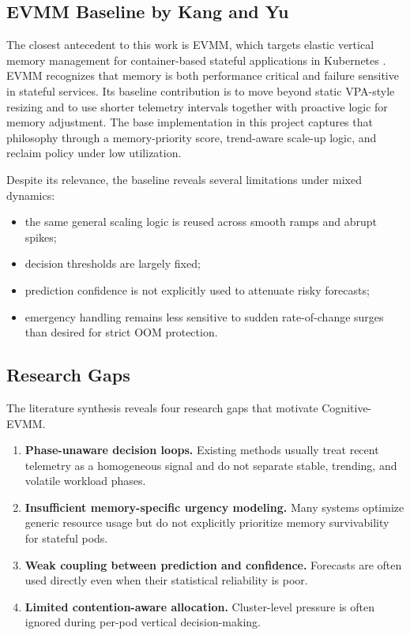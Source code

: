 \documentclass[12pt,a4paper]{article}
\begin{document}
\subsection{EVMM Baseline by Kang and Yu}

The closest antecedent to this work is EVMM, which targets elastic vertical memory management for container-based stateful applications in Kubernetes \cite{evmm2025}. EVMM recognizes that memory is both performance critical and failure sensitive in stateful services. Its baseline contribution is to move beyond static VPA-style resizing and to use shorter telemetry intervals together with proactive logic for memory adjustment. The base implementation in this project captures that philosophy through a memory-priority score, trend-aware scale-up logic, and reclaim policy under low utilization.

Despite its relevance, the baseline reveals several limitations under mixed dynamics:
\begin{itemize}
    \item the same general scaling logic is reused across smooth ramps and abrupt spikes;
    \item decision thresholds are largely fixed;
    \item prediction confidence is not explicitly used to attenuate risky forecasts;
    \item emergency handling remains less sensitive to sudden rate-of-change surges than desired for strict OOM protection.
\end{itemize}

\subsection{Research Gaps}

The literature synthesis reveals four research gaps that motivate Cognitive-EVMM.
\begin{enumerate}[label=\arabic*)]
    \item \textbf{Phase-unaware decision loops.} Existing methods usually treat recent telemetry as a homogeneous signal and do not separate stable, trending, and volatile workload phases.
    \item \textbf{Insufficient memory-specific urgency modeling.} Many systems optimize generic resource usage but do not explicitly prioritize memory survivability for stateful pods.
    \item \textbf{Weak coupling between prediction and confidence.} Forecasts are often used directly even when their statistical reliability is poor.
    \item \textbf{Limited contention-aware allocation.} Cluster-level pressure is often ignored during per-pod vertical decision-making.
\end{enumerate}
\end{document}
